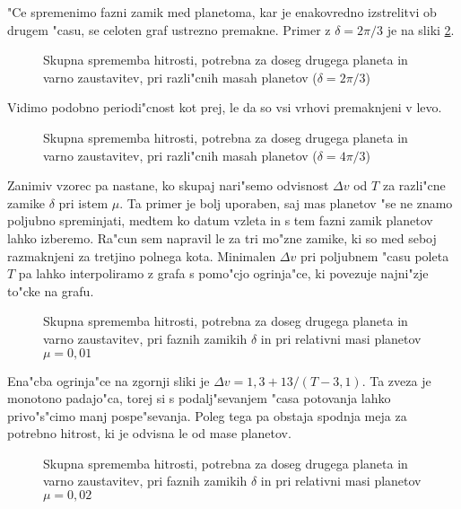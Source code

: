 \documentclass[a4paper,10pt]{article}
\begin{document}
"Ce spremenimo fazni zamik med planetoma, kar je enakovredno izstrelitvi ob drugem "casu, se celoten graf ustrezno premakne. Primer z $\delta = 2\pi/3$ je na sliki \ref{fig:hitrost-2}. 

\begin{figure}[H]
\centering
 
 \caption{Skupna sprememba hitrosti, potrebna za doseg drugega planeta in varno zaustavitev, pri razli"cnih masah planetov ($\delta = 2\pi/3$)}
 \label{fig:hitrost}
\end{figure}

Vidimo podobno periodi"cnost kot prej, le da so vsi vrhovi premaknjeni v levo. 

\begin{figure}[H]
\centering
 
 \caption{Skupna sprememba hitrosti, potrebna za doseg drugega planeta in varno zaustavitev, pri razli"cnih masah planetov ($\delta = 4\pi/3$)}
 \label{fig:hitrost-2}
\end{figure}

Zanimiv vzorec pa nastane, ko skupaj nari"semo odvisnost $\Delta v$ od $T$ za razli"cne zamike $\delta$ pri istem $\mu$. Ta primer je bolj uporaben, saj mas planetov "se ne znamo poljubno spreminjati, medtem ko datum vzleta in s tem fazni zamik planetov lahko izberemo. Ra"cun sem napravil le za tri mo"zne zamike, ki so med seboj razmaknjeni za tretjino polnega kota. Minimalen $\Delta v$ pri poljubnem "casu poleta $T$ pa lahko interpoliramo z grafa s pomo"cjo ogrinja"ce, ki povezuje najni"zje to"cke na grafu.  

\begin{figure}[H]
\centering
 
 \caption{Skupna sprememba hitrosti, potrebna za doseg drugega planeta in varno zaustavitev, pri faznih zamikih $\delta$ in pri relativni masi planetov $\mu=0,\!01$}
 \label{fig:hitrost-delta}
\end{figure}

Ena"cba ogrinja"ce na zgornji sliki je $\Delta v = 1,\!3 + 13/(T-3,\!1)$. Ta zveza je monotono padajo"ca, torej si s podalj"sevanjem "casa potovanja lahko privo"s"cimo manj pospe"sevanja. Poleg tega pa obstaja spodnja meja za potrebno hitrost, ki je odvisna le od mase planetov. 

\begin{figure}[H]
\centering
 
 \caption{Skupna sprememba hitrosti, potrebna za doseg drugega planeta in varno zaustavitev, pri faznih zamikih $\delta$ in pri relativni masi planetov $\mu=0,\!02$}
 \label{fig:hitrost-delta}
\end{figure}
\end{document}
